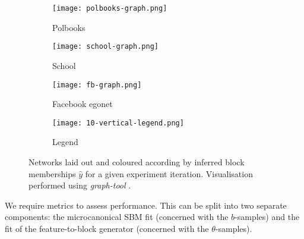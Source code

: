 \begin{figure}[!h]
	\centering
	\begin{subfigure}[t]{0.28\linewidth}
		\centering
		\texttt{[image: polbooks-graph.png]}
		\caption{Polbooks}
		\label{fig:polbooks-graph}
	\end{subfigure}
	\hfill
	\begin{subfigure}[t]{0.28\linewidth}
		\centering
		\texttt{[image: school-graph.png]}
		\caption{School}
		\label{fig:school-graph}
	\end{subfigure}
	\hfill
	\begin{subfigure}[t]{0.28\linewidth}
		\centering
		\texttt{[image: fb-graph.png]}
		\caption{Facebook egonet}
		\label{fig:fb-graph}
	\end{subfigure}
	\begin{subfigure}[t]{0.11\linewidth}
		\centering
		\texttt{[image: 10-vertical-legend.png]}
		\caption{Legend}
		\label{fig:10-legend}
	\end{subfigure}
	\caption{Networks laid out and coloured according by inferred block memberships $\hat{y}$ for a given experiment iteration. Visualisation performed using \textit{graph-tool} \cite{peixoto_graph-tool_2014}.}
	\label{fig:graphs-all}
\end{figure}
\begin{table}[!h]
	\centering
	\caption{Experimental results averaged over $n=10$ iterations (mean $\pm$ standard deviation).}
	\label{tab:results}
\end{table}
%
We require metrics to assess performance. This can be split into two separate 
components: the microcanonical SBM fit (concerned with the $b$-samples) and 
the fit of the feature-to-block generator (concerned with the $\theta$-samples). 

